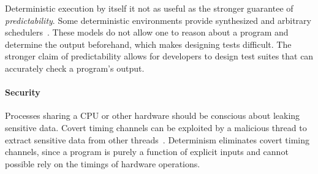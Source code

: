 Deterministic execution by itself it not as useful as the stronger guarantee of
\emph{predictability}. Some deterministic environments provide synthesized and
arbitrary schedulers~\cite{Aviram10,Devietti09}. These models do not allow one
to reason about a program and determine the output beforehand, which makes
designing tests difficult. The stronger claim of predictability allows for
developers to design test suites that can accurately check a program's output.
\iffalse
need I say more? tie into Determinator?
\fi

\paragraph{Security} Processes sharing a CPU or other hardware should be
conscious about leaking sensitive data. Covert timing channels can be exploited
by a malicious thread to extract sensitive data from other
threads~\cite{Aviram10cloud}. Determinism eliminates covert timing channels,
since a program is purely a function of explicit inputs and cannot possible rely
on the timings of hardware operations.

\iffalse
\begin{itemize}
	\item Deterministic execution benefits, four main areas
	\begin{itemize}
		\item Debugging becomes easier, since bugs are always reproducible. Benefits
			enhanced by Determinator’s predictability.
		\item Testing: one-to-one mapping for inputs to outputs. Again, predictability
			and modularity can simplify designing tests.
		\item Fault tolerance
		\item Security: covert channels
	\end{itemize}
	\item "Point solutions" in particular areas are unrelated to each other and do
		not compose well. (Find point solutions to go into relevant work.)
	\item Determinism is solution offering benefits in all areas at once.
	\item Determinator’s design also provides predictability. Programmers can
		reason about code without having to make assumptions: nothing is arbitrary.
		"Program logic alone" determines how a program proceeds.
	\item Linux is widely used, deployed on millions of machines. Potential for
		uptake is very high if we can make the implementation reasonably easy to
		patch.
	\item Aviram compared Determinator to Linux, but we can compare deterministic
		Linux to nondeterministic Linux for nearly optimal evaluation of this design.
\end{itemize}
\fi

